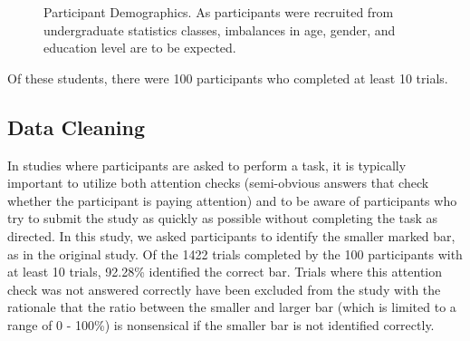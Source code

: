 \documentclass[runningheads
]{llncs}
\begin{document}
\begin{figure}
\begin{minipage}[t]{0.33\linewidth}
{}


\end{minipage}%
%
\begin{minipage}[t]{0.33\linewidth}



\end{minipage}%

\caption{\label{fig-demographics}Participant Demographics. As
participants were recruited from undergraduate statistics classes,
imbalances in age, gender, and education level are to be expected.}

\end{figure}%

Of these students, there were 100 participants who completed at least 10
trials.

\subsection{Data Cleaning}\label{data-cleaning}

In studies where participants are asked to perform a task, it is
typically important to utilize both attention checks (semi-obvious
answers that check whether the participant is paying attention) and to
be aware of participants who try to submit the study as quickly as
possible without completing the task as directed. In this study, we
asked participants to identify the smaller marked bar, as in the
original study. Of the 1422 trials completed by the 100 participants
with at least 10 trials, 92.28\% identified the correct bar. Trials
where this attention check was not answered correctly have been excluded
from the study with the rationale that the ratio between the smaller and
larger bar (which is limited to a range of 0 - 100\%) is nonsensical if
the smaller bar is not identified correctly.
\end{document}
